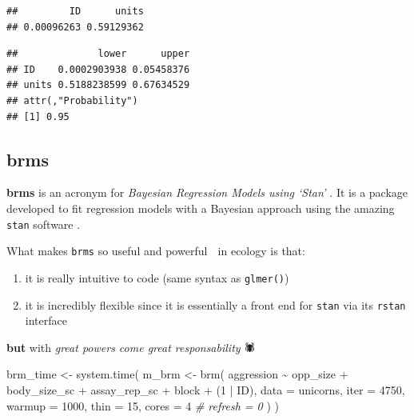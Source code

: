 \documentclass[
  12pt,
]{book}
\newenvironment{Shaded}{\begin{snugshade}}{\end{snugshade}}
\newcommand{\AttributeTok}[1]{\textcolor[rgb]{0.77,0.63,0.00}{#1}}
\newcommand{\CommentTok}[1]{\textcolor[rgb]{0.56,0.35,0.01}{\textit{#1}}}
\newcommand{\DecValTok}[1]{\textcolor[rgb]{0.00,0.00,0.81}{#1}}
\newcommand{\FunctionTok}[1]{\textcolor[rgb]{0.00,0.00,0.00}{#1}}
\newcommand{\NormalTok}[1]{#1}
\newcommand{\OtherTok}[1]{\textcolor[rgb]{0.56,0.35,0.01}{#1}}
\newcommand{\SpecialCharTok}[1]{\textcolor[rgb]{0.00,0.00,0.00}{#1}}
\providecommand{\tightlist}{%
  \setlength{\itemsep}{0pt}\setlength{\parskip}{0pt}}
\begin{document}
\begin{verbatim}
##         ID      units 
## 0.00096263 0.59129362
\end{verbatim}

\begin{Shaded}
\end{Shaded}

\begin{verbatim}
##              lower      upper
## ID    0.0002903938 0.05458376
## units 0.5188238599 0.67634529
## attr(,"Probability")
## [1] 0.95
\end{verbatim}

\hypertarget{brms}{%
\subsection{brms}\label{brms}}

\textbf{brms} is an acronym for \emph{Bayesian Regression Models using `Stan'} \citep{R-brms}. It is a package developed to fit regression models with a Bayesian approach using the amazing \texttt{stan} software \citep{stan2021}.

What makes \texttt{brms} so useful and powerful 💪 in ecology is that:

\begin{enumerate}
\def\labelenumi{\arabic{enumi}.}
\tightlist
\item
  it is really intuitive to code (same syntax as \texttt{glmer()})
\item
  it is incredibly flexible since it is essentially a front end for \texttt{stan} via its \texttt{rstan} interface \citep{R-rstan}
\end{enumerate}

\textbf{but} with \emph{great powers come great responsability} 🕷

\begin{Shaded}
\begin{Highlighting}[]
\NormalTok{brm\_time }\OtherTok{\textless{}{-}} \FunctionTok{system.time}\NormalTok{(}
\NormalTok{  m\_brm }\OtherTok{\textless{}{-}} \FunctionTok{brm}\NormalTok{(}
\NormalTok{    aggression }\SpecialCharTok{\textasciitilde{}}\NormalTok{ opp\_size }\SpecialCharTok{+}\NormalTok{ body\_size\_sc }\SpecialCharTok{+}\NormalTok{ assay\_rep\_sc }\SpecialCharTok{+}\NormalTok{ block}
      \SpecialCharTok{+}\NormalTok{ (}\DecValTok{1} \SpecialCharTok{|}\NormalTok{ ID),}
    \AttributeTok{data =}\NormalTok{ unicorns, }\AttributeTok{iter =} \DecValTok{4750}\NormalTok{, }\AttributeTok{warmup =} \DecValTok{1000}\NormalTok{, }\AttributeTok{thin =} \DecValTok{15}\NormalTok{, }\AttributeTok{cores =} \DecValTok{4}
    \CommentTok{\# refresh = 0}
\NormalTok{  )}
\NormalTok{)}
\end{Highlighting}
\end{Shaded}
\end{document}
